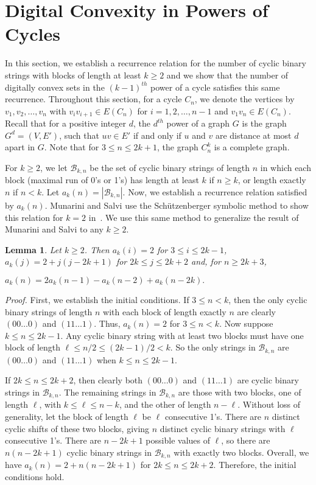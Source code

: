 \documentclass[12pt]{article}
\newtheorem{lemma}[thm]{Lemma}
\begin{document}
\section{Digital Convexity in Powers of Cycles}

In this section, we establish a recurrence relation for the number of cyclic binary strings with blocks of length at least $k\geq 2$ and we show that the number of digitally convex sets in the $(k-1)^{th}$ power of a cycle satisfies this same recurrence. Throughout this section, for a cycle $C_n$, we denote the vertices by $v_1,v_2,\dots,v_n$ with $v_iv_{i+1}\in E(C_n)$ for $i=1,2,\dots,n-1$ and $v_1v_n\in E(C_n)$. Recall that for a positive integer $d$, the $d^{th}$ power of a graph $G$ is the graph $G^d=(V,E')$, such that $uv\in E'$ if and only if $u$ and $v$ are distance at most $d$ apart in $G$. Note that for $3\leq n \leq 2k+1$, the graph $C^k_n$ is a complete graph. 

For $k\geq 2$, we let $\mathscr{B}_{k,n}$ be the set of cyclic binary strings of length $n$ in which each block (maximal run of 0's or 1's) has length at least $k$ if $n\geq k$, or length exactly $n$ if $n<k$. Let $a_k(n)=|\mathscr{B}_{k,n}|$. Now, we establish a recurrence relation satisfied by $a_k(n)$. Munarini and Salvi use the Sch\"utzenberger symbolic method to show this relation for $k=2$ in~\cite{zigzag}. We use this same method to generalize the result of Munarini and Salvi to any $k\geq 2$. 

\begin{lemma}
Let $k\geq 2$. Then $a_k(i)=2$ for $3\leq i\leq 2k-1$, $a_k(j)=2+j(j-2k+1)$ for $2k\leq j\leq 2k+2$ and, for $n\geq 2k+3$, \begin{center}$a_k(n)=2a_k(n-1)-a_k(n-2)+a_k(n-2k).$\end{center} 
\label{lem:bin}
\end{lemma}

\noindent
\emph{Proof.} First, we establish the initial conditions. If $3\leq n < k$, then the only cyclic binary strings of length $n$ with each block of length exactly $n$ are clearly $(00\dots0)$ and $(11\dots1)$. Thus, $a_k(n)=2$ for $3\leq n<k$. Now suppose $k\leq n\leq 2k-1$. Any cyclic binary string with at least two blocks must have one block of length $\ell\leq n/2 \leq (2k-1)/2<k$. So the only strings in $\mathscr{B}_{k,n}$ are $(00\dots0)$ and $(11\dots1)$ when $k\leq n\leq 2k-1$. 

If $2k\leq n\leq 2k+2$, then clearly both $(0 0\dots0)$ and $(1 1\dots1)$ are cyclic binary strings in $\mathscr{B}_{k,n}$. The remaining strings in $\mathscr{B}_{k,n}$ are those with two blocks, one of length $\ell$, with $k\leq \ell \leq n-k$, and the other of length $n-\ell$. Without loss of generality, let the block of length $\ell$ be $\ell$ consecutive 1's. There are $n$ distinct cyclic shifts of these two blocks, giving $n$ distinct cyclic binary strings with $\ell$ consecutive 1's. There are $n-2k+1$ possible values of $\ell$, so there are $n(n-2k+1)$ cyclic binary strings in $\mathscr{B}_{k,n}$ with exactly two blocks. Overall, we have $a_k(n)=2+n(n-2k+1)$ for $2k\leq n\leq 2k+2$. Therefore, the initial conditions hold. 
\end{document}
